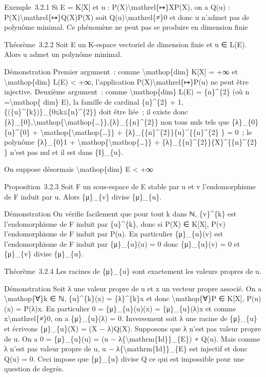\documentclass[]{article}
\begin{document}
Exemple~3.2.1 Si E = K{[}X{]} et u :
P(X)\textbackslash{}mathrel\{↦\}XP(X), on a Q(u) :
P(X)\textbackslash{}mathrel\{↦\}Q(X)P(X) soit
Q(u)\textbackslash{}mathrel\{≠\}0 et donc u n'admet pas de polynôme
minimal. Ce phénomène ne peut pas se produire en dimension finie

Théorème~3.2.2 Soit E un K-espace vectoriel de dimension finie et u ∈
L(E). Alors u admet un polynôme minimal.

Démonstration Premier argument~: comme \textbackslash{}mathop\{dim\}
K{[}X{]} = +∞ et \textbackslash{}mathop\{dim\} L(E) \textless{} +∞,
l'application P(X)\textbackslash{}mathrel\{↦\}P(u) ne peut être
injective. Deuxième argument~: comme \textbackslash{}mathop\{dim\} L(E)
= \{n\}\^{}\{2\} (où n =\textbackslash{}mathop\{ dim\} E), la famille de
cardinal \{n\}\^{}\{2\} + 1,
\{(\{u\}\^{}\{k\})\}\_\{0≤k≤\{n\}\^{}\{2\}\} doit être liée~; il existe
donc
\{λ\}\_\{0\},\textbackslash{}mathop\{\textbackslash{}mathop\{\ldots{}\}\},\{λ\}\_\{\{n\}\^{}\{2\}\}
non tous nuls tels que \{λ\}\_\{0\}\{u\}\^{}\{0\} +
\textbackslash{}mathop\{\textbackslash{}mathop\{\ldots{}\}\} +
\{λ\}\_\{\{n\}\^{}\{2\}\}\{u\}\^{}\{\{n\}\^{}\{2\} \} = 0~; le polynôme
\{λ\}\_\{0\}1 +
\textbackslash{}mathop\{\textbackslash{}mathop\{\ldots{}\}\} +
\{λ\}\_\{\{n\}\^{}\{2\}\}\{X\}\^{}\{\{n\}\^{}\{2\} \} n'est pas nul et
il est dans \{I\}\_\{u\}.

On suppose désormais \textbackslash{}mathop\{dim\} E \textless{} +∞

Proposition~3.2.3 Soit F un sous-espace de E stable par u et v
l'endomorphisme de F induit par u. Alors \{μ\}\_\{v\} divise
\{μ\}\_\{u\}.

Démonstration On vérifie facilement que pour tout k dans ℕ,
\{v\}\^{}\{k\} est l'endomorphisme de F induit par \{u\}\^{}\{k\}, donc
si P(X) ∈ K{[}X{]}, P(v) l'endomorphisme de F induit par P(u). En
particulier \{μ\}\_\{u\}(v) est l'endomorphisme de F induit par
\{μ\}\_\{u\}(u) = 0 donc \{μ\}\_\{u\}(v) = 0 et \{μ\}\_\{v\} divise
\{μ\}\_\{u\}.

Théorème~3.2.4 Les racines de \{μ\}\_\{u\} sont exactement les valeurs
propres de u.

Démonstration Soit λ une valeur propre de u et x un vecteur propre
associé. On a \textbackslash{}mathop\{∀\}k ∈ ℕ, \{u\}\^{}\{k\}(x) =
\{λ\}\^{}\{k\}x et donc \textbackslash{}mathop\{∀\}P ∈ K{[}X{]}, P(u)(x)
= P(λ)x. En particulier 0 = \{μ\}\_\{u\}(u)(x) = \{μ\}\_\{u\}(λ)x et
comme x\textbackslash{}mathrel\{≠\}0, on a \{μ\}\_\{u\}(λ) = 0.
Inversement soit λ une racine de \{μ\}\_\{u\} et écrivons
\{μ\}\_\{u\}(X) = (X − λ)Q(X). Supposons que λ n'est pas valeur propre
de u. On a 0 = \{μ\}\_\{u\}(u) = (u −
λ\{\textbackslash{}mathrm\{Id\}\}\_\{E\}) ∘ Q(u). Mais comme λ n'est pas
valeur propre de u, u − λ\{\textbackslash{}mathrm\{Id\}\}\_\{E\} est
injectif et donc Q(u) = 0. Ceci impose que \{μ\}\_\{u\} divise Q ce qui
est impossible pour une question de degrés.
\end{document}
